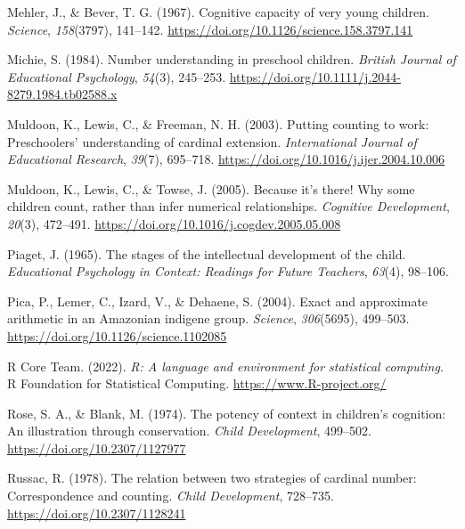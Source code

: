 \documentclass[
  man,floatsintext]{apa7}
\newlength{\cslhangindent}
\newlength{\cslentryspacingunit} %
\newenvironment{CSLReferences}[2] %
 {%
  \setlength{\parindent}{0pt}
  \ifodd #1
  \let\oldpar\par
  \def\par{\hangindent=\cslhangindent\oldpar}
  \fi
  \setlength{\parskip}{#2\cslentryspacingunit}
 }%
 {}
\begin{document}
\begin{CSLReferences}{1}{0}
\leavevmode{}%
Mehler, J., \& Bever, T. G. (1967). Cognitive capacity of very young children. \emph{Science}, \emph{158}(3797), 141--142. \url{https://doi.org/10.1126/science.158.3797.141}

\leavevmode{}%
Michie, S. (1984). Number understanding in preschool children. \emph{British Journal of Educational Psychology}, \emph{54}(3), 245--253. \url{https://doi.org/10.1111/j.2044-8279.1984.tb02588.x}

\leavevmode{}%
Muldoon, K., Lewis, C., \& Freeman, N. H. (2003). Putting counting to work: Preschoolers' understanding of cardinal extension. \emph{International Journal of Educational Research}, \emph{39}(7), 695--718. \url{https://doi.org/10.1016/j.ijer.2004.10.006}

\leavevmode{}%
Muldoon, K., Lewis, C., \& Towse, J. (2005). Because it's there! Why some children count, rather than infer numerical relationships. \emph{Cognitive Development}, \emph{20}(3), 472--491. \url{https://doi.org/10.1016/j.cogdev.2005.05.008}

\leavevmode{}%
Piaget, J. (1965). The stages of the intellectual development of the child. \emph{Educational Psychology in Context: Readings for Future Teachers}, \emph{63}(4), 98--106.

\leavevmode{}%
Pica, P., Lemer, C., Izard, V., \& Dehaene, S. (2004). Exact and approximate arithmetic in an {Amazonian} indigene group. \emph{Science}, \emph{306}(5695), 499--503. \url{https://doi.org/10.1126/science.1102085}

\leavevmode{}%
R Core Team. (2022). \emph{R: A language and environment for statistical computing}. R Foundation for Statistical Computing. \url{https://www.R-project.org/}

\leavevmode{}%
Rose, S. A., \& Blank, M. (1974). The potency of context in children's cognition: An illustration through conservation. \emph{Child Development}, 499--502. \url{https://doi.org/10.2307/1127977}

\leavevmode{}%
Russac, R. (1978). The relation between two strategies of cardinal number: Correspondence and counting. \emph{Child Development}, 728--735. \url{https://doi.org/10.2307/1128241}


\end{CSLReferences}
\end{document}

